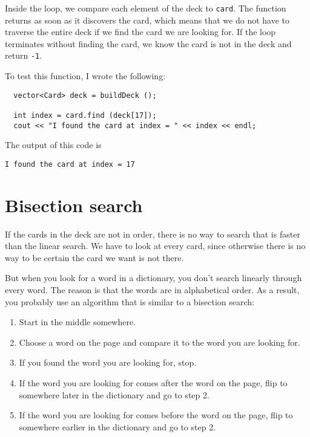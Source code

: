 Inside the loop, we compare each element of the deck to
{\tt card}.  The function returns as soon as it discovers
the card, which means that we do not have to traverse the entire
deck if we find the card we are looking for.  If the loop terminates
without finding the card, we know the card is not in the deck
and return {\tt -1}.


To test this function, I wrote the following:

\begin{lstlisting}
  vector<Card> deck = buildDeck ();

  int index = card.find (deck[17]);
  cout << "I found the card at index = " << index << endl;
\end{lstlisting}
%
The output of this code is

\begin{lstlisting}
I found the card at index = 17
\end{lstlisting}
%


\section{Bisection search}

If the cards in the deck are not in order, there is no way to search
that is faster than the linear search.  We have to look at every card,
since otherwise there is no way to be certain the card we want is not
there.

But when you look for a word in a dictionary, you don't search
linearly through every word.  The reason is that the words are in
alphabetical order.  As a result, you probably use an algorithm that
is similar to a bisection search:

\begin {enumerate}

\item Start in the middle somewhere.

\item Choose a word on the page and compare it to the word you
are looking for.

\item If you found the word you are looking for, stop.

\item If the word you are looking for comes after the word on
the page, flip to somewhere later in the dictionary and go to
step 2.

\item If the word you are looking for comes before the word on
the page, flip to somewhere earlier in the dictionary and go to
step 2.

\end {enumerate}

